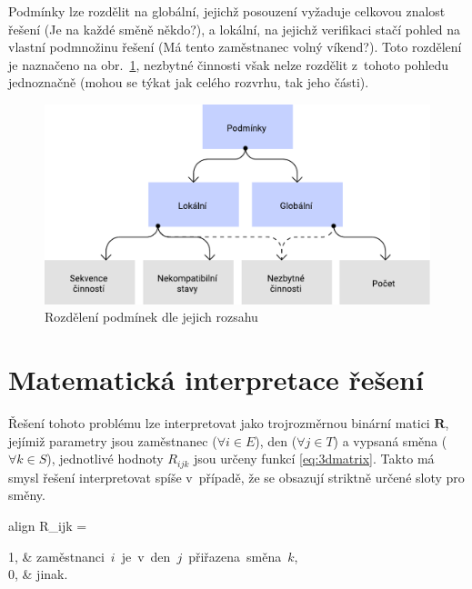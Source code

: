 \documentclass[a4paper,11pt,openany,twoside]{book}
\newcommand{\coloredeq}[2]{\begin{empheq}{align}\label{#1}\hspace{1em}#2\hspace{1em}\end{empheq}}
\begin{document}
Podmínky lze rozdělit na globální, jejichž posouzení vyžaduje celkovou znalost řešení (Je na každé směně někdo?), a lokální, na jejichž verifikaci stačí pohled na vlastní podmnožinu řešení (Má tento zaměstnanec volný víkend?). Toto rozdělení je naznačeno na obr.~\ref{fig:constraints}, nezbytné činnosti však nelze rozdělit z~tohoto pohledu jednoznačně (mohou se týkat jak celého rozvrhu, tak jeho části). \cite{blochliger2004modeling}

\begin{figure}[h]
	\centering
	\includegraphics[scale=0.7]{img/constraints.pdf}
	\caption{Rozdělení podmínek dle jejich rozsahu}
	\label{fig:constraints}
\end{figure}

\section{Matematická interpretace řešení}
Řešení tohoto problému lze interpretovat jako trojrozměrnou binární matici $\boldsymbol{R}$, jejímiž parametry jsou zaměstnanec ($\forall i \in E$), den ($\forall j \in T$) a vypsaná směna ($\forall k \in S$), jednotlivé hodnoty $R_{ijk}$ jsou určeny funkcí \ref{eq:3dmatrix}. \cite{vaclavik2016roster} Takto má smysl řešení interpretovat spíše v~případě, že se obsazují striktně určené sloty pro směny.

\coloredeq{eq:3dmatrix}{
	R_{ijk} =
	\begin{cases}
		1, & \mbox{zaměstnanci $i$ je v den $j$ přiřazena směna $k$,} \\
		0, & \mbox{jinak.}\\
	\end{cases}
}
\end{document}
